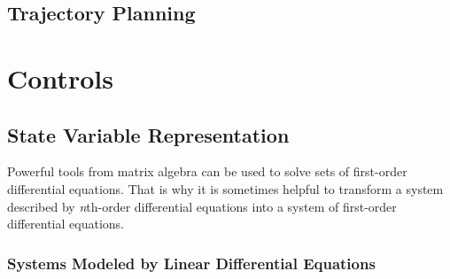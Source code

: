 \documentclass[11pt]{book}
\begin{document}
\section{Trajectory Planning}

\chapter{Controls}

\section{State Variable Representation}

Powerful tools from matrix algebra can be used to solve sets of first-order differential equations. That is why it is sometimes helpful to transform a system described by \emph{n}th-order differential equations into a system of first-order differential equations.

\subsection{Systems Modeled by Linear Differential Equations}
\end{document}
